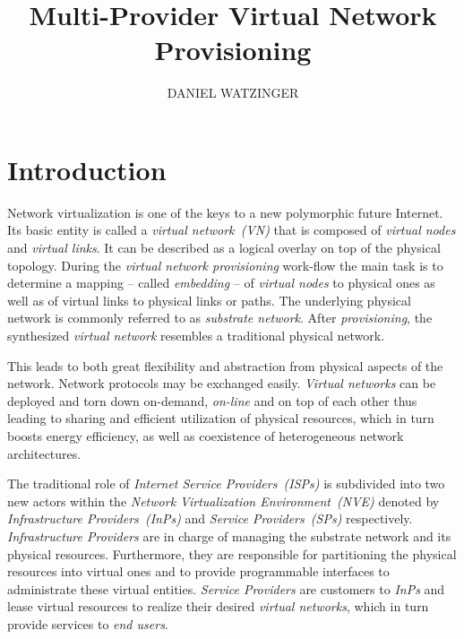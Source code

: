 \documentclass[prodmode,acmtomccap]{acmlarge}
\title{Multi-Provider Virtual Network Provisioning}
\author{DANIEL WATZINGER\affil{University of Passau}}
\begin{document}
\maketitle

\section{Introduction}
\label{sec:introduction}

\small

Network virtualization is one of the keys to a new polymorphic future Internet. Its basic entity is called a 
\emph{virtual network~(VN)} that is composed of \emph{virtual nodes} and \emph{virtual links}. It can be described as
a logical overlay on top of the physical topology.
During the \emph{virtual network provisioning} work-flow the main task is to determine a mapping 
-- called \emph{embedding} -- of \emph{virtual nodes} to physical ones as well as of virtual links to physical links or paths.
The underlying physical network is commonly referred to as \emph{substrate network}.
After \emph{provisioning}, the synthesized \emph{virtual network} resembles a traditional physical network.

This leads to both great flexibility and abstraction from physical aspects of the network. Network protocols may be exchanged easily. 
\emph{Virtual networks} can be deployed and torn down on-demand, 
\emph{on-line} and on top of each other thus leading to sharing and efficient utilization of physical resources, which in turn boosts energy efficiency, 
as well as coexistence of heterogeneous network architectures.

The traditional role of \emph{Internet Service Providers~(ISPs)} is subdivided into two new actors within the \emph{Network Virtualization Environment~(NVE)} denoted by 
\emph{Infrastructure Providers~(InPs)} and \emph{Service Providers~(SPs)} respectively.
\emph{Infrastructure Providers} are in charge of managing the substrate network and its physical resources. Furthermore, they are responsible for partitioning the physical resources
into virtual ones and to provide programmable interfaces to administrate these virtual entities.
\emph{Service Providers} are customers to \emph{InPs} and lease virtual resources to realize their desired \emph{virtual networks}, which in turn provide services to \emph{end users}.
\end{document}
